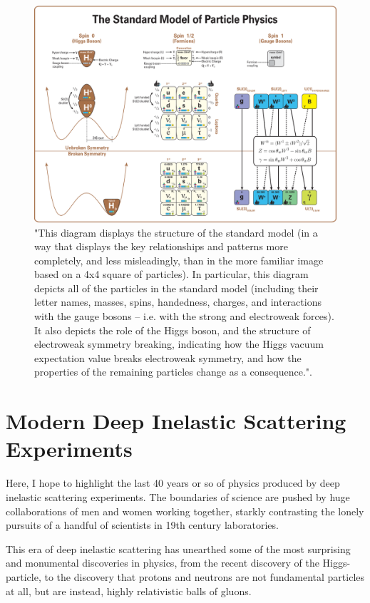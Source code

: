 \begin{figure}[ht]
	\centering
	\includegraphics[width=\linewidth]{./figures/standard_model_complete_lowres.png}
	\caption{
		"This diagram displays the structure of the standard model (in a way that
		displays the key relationships and patterns more completely, and less
		misleadingly, than in the more familiar image based on a 4x4 square of
		particles). In particular, this diagram depicts all of the particles in the
		standard model (including their letter names, masses, spins, handedness,
		charges, and interactions with the gauge bosons -- i.e. with the strong and
		electroweak forces). It also depicts the role of the Higgs boson, and the
		structure of electroweak symmetry breaking, indicating how the Higgs vacuum
		expectation value breaks electroweak symmetry, and how the properties of the
		remaining particles change as a consequence."\cite{Boyle2014}.
	}
	\label{fig:standardmodel}
\end{figure}


\clearpage
\section{Modern Deep Inelastic Scattering Experiments}

Here, I hope to highlight the last 40 years or so of physics produced by deep
inelastic scattering experiments. The boundaries of science are pushed by huge
collaborations of men and women working together, starkly contrasting the lonely
pursuits of a handful of scientists in 19th century laboratories.

This era of deep inelastic scattering has unearthed some of the most surprising
and monumental discoveries in physics, from the recent discovery of the
Higgs-particle, to the discovery that protons and neutrons are not fundamental
particles at all, but are instead, highly relativistic balls of gluons.

